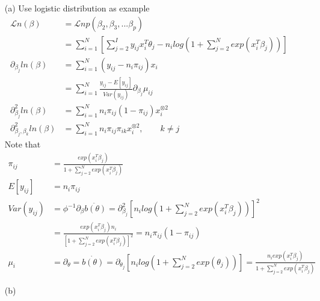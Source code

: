 \begin{itemize}
    \item [(a)] Use logistic distribution as example
\begin{align*}
    \mathcal{L}n (\beta) &= \mathcal{L}n p(\beta_2, \beta_3,... \beta_p) \\
    &= \sum_{i=1}^N \left[ \sum_{j=2}^I  y_{ij} x_i^T \theta_j - n_i log \left( 1+ \sum_{j=2}^N exp(x_i^T \beta_j) \right) \right] \\
    \partial_{\beta_j} \mathit{l}n (\beta) &=  \sum_{i=1}^N (y_{ij} - n_{i} \pi_{ij}) x_i \\
    &=  \sum_{i=1}^N \frac{y_{ij} - E[y_{ij}]}{Var(y_{ij})} \partial_{\beta_j} \mu_{ij}\\
    \partial^2_{\beta_j} \mathit{l}n (\beta) &=  \sum_{i=1}^N n_{i} \pi_{ij} (1- \pi_{ij}) x_i^{\otimes 2} \\
    \partial^2_{\beta_j, \beta_k} \mathit{l}n (\beta) &=  \sum_{i=1}^N n_{i}  \pi_{ij} \pi_{ik} x_i^{\otimes 2}, \qquad k \neq j
\end{align*}
Note that
\begin{align*}
    \pi_{ij} &= \frac{exp(x_i^T\beta_j)}{1+ \sum_{j=2}^N exp(x_i^T \beta_j)} \\
    E[y_{ij}] &= n_i \pi_{ij}\\
    Var(y_{ij})&= \phi^{-1} \partial_{\beta} \ddot{b(\theta)}= \partial^2_{\beta_j} \left[ n_i log \left( 1+ \sum_{j=2}^N exp(x_i^T \beta_j) \right) \right ] ^2\\
    &=\frac{exp(x_i^T\beta_j)n_i}{\left[ 1+ \sum_{j=2}^N exp(x_i^T \beta_j)\right ]^2} = n_i \pi_{ij} (1-\pi_{ij})\\
    \mu_i &= \partial_{\theta} = \dot{b(\theta)} = \partial_{\theta_j} \left[ n_i log \left( 1+ \sum_{j=2}^N exp(\theta_j) \right) \right ] =  \frac{n_i exp(x_i^T\beta_j)}{1+ \sum_{j=2}^N exp(x_i^T \beta_j)}
\end{align*}
    \item[(b)] 
      
\end{itemize}


